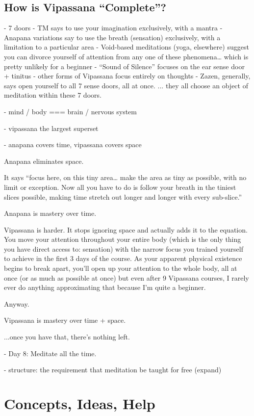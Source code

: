 \documentclass[a4paper, amsfonts, amssymb, amsmath, reprint, showkeys, nofootinbib, twoside]{revtex4-1}
\begin{document}
\subsection{How is Vipassana ``Complete''?}

- 7 doors
- TM says to use your imagination exclusively, with a mantra
- Anapana variations say to use the breath (sensation) exclusively, with a limitation to a particular area
- Void-based meditations (yoga, elsewhere) suggest you can divorce yourself of attention from any one of these phenomena… which is pretty unlikely for a beginner
- “Sound of Silence” focuses on the ear sense door + tinitus
- other forms of Vipassana focus entirely on thoughts
- Zazen, generally, says open yourself to all 7 sense doors, all at once.
... they all choose an object of meditation within these 7 doors.

- mind / body === brain / nervous system

- vipassana the largest superset

- anapana covers time, vipassana covers space

Anapana eliminates space.

It says “focus here, on this tiny area… make the area as tiny as possible, with no
limit or exception. Now all you have to do is follow your breath in the tiniest
slices possible, making time stretch out longer and longer with every sub-slice.”

Anapana is mastery over time.

Vipassana is harder. It stops ignoring space and actually adds it to the equation. You move your attention throughout your entire body (which is the only thing you have direct access to: sensation) with the narrow focus you trained yourself to achieve in the first 3 days of the course. As your apparent physical existence begins to break apart, you’ll open up your attention to the whole body, all at once (or as much as possible at once) but even after 9 Vipassana courses, I rarely ever do anything approximating that because I’m quite a beginner. 🙂

Anyway.

Vipassana is mastery over time + space.

...once you have that, there’s nothing left.

- Day 8: Meditate all the time.

- structure: the requirement that meditation be taught for free (expand)


\section{Concepts, Ideas, Help}
\end{document}
